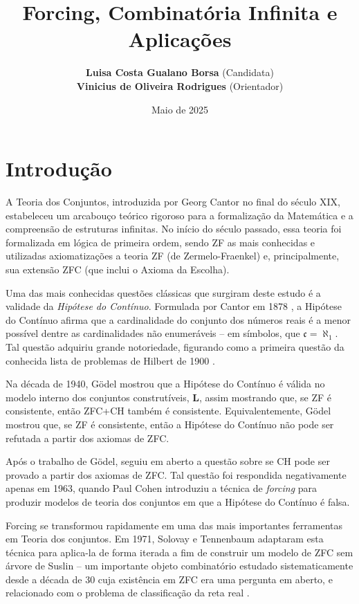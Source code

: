 \documentclass{article}
\author{
   \textbf{Luisa Costa Gualano Borsa} (Candidata)\\
    \textbf{Vinicius de Oliveira Rodrigues} (Orientador)\\
}
\title{\textbf{Forcing, Combinatória Infinita e Aplicações}}
\date{Maio de 2025}
\begin{document}
\maketitle
\begin{abstract}
\end{abstract}

\section{Introdução}
    A Teoria dos Conjuntos, introduzida por Georg Cantor no final do século XIX, estabeleceu um arcabouço teórico rigoroso para a formalização da Matemática e a compreensão de estruturas infinitas. No início do século passado, essa teoria foi formalizada em lógica de primeira ordem, sendo ZF as mais conhecidas e utilizadas axiomatizações a teoria ZF (de Zermelo-Fraenkel) e, principalmente, sua extensão ZFC (que inclui o Axioma da Escolha).

    Uma das mais conhecidas questões clássicas que surgiram deste estudo é a validade da \emph{Hipótese do Contínuo}.
    Formulada por Cantor em 1878 \cite{cantor1878beitrag}, a Hipótese do Contínuo afirma que a cardinalidade do conjunto dos números reais é a menor possível dentre as cardinalidades não enumeráveis -- em símbolos, que $\mathfrak c=\aleph_1$.
    Tal questão adquiriu grande notoriedade, figurando como a primeira questão da conhecida lista de problemas de Hilbert de 1900 \cite{hilbert1900mathematische}.

    Na década de 1940, Gödel mostrou que a Hipótese do Contínuo é válida no modelo interno dos conjuntos construtíveis, $\mathbf{L}$, assim mostrando que, se ZF é consistente, então ZFC+CH também é consistente.
    Equivalentemente, Gödel mostrou que, se ZF é consistente, então a Hipótese do Contínuo não pode ser refutada a partir dos axiomas de ZFC.
    
    Após o trabalho de Gödel, seguiu em aberto a questão sobre se CH pode ser provado a partir dos axiomas de ZFC.
    Tal questão foi respondida negativamente apenas em 1963, quando Paul Cohen \cite{cohen1963independence} introduziu a técnica de \emph{forcing} para produzir modelos de teoria dos conjuntos em que a Hipótese do Contínuo é falsa.

    Forcing se transformou rapidamente em uma das mais importantes ferramentas em Teoria dos conjuntos.
    Em 1971, Solovay e Tennenbaum \cite{solovay1971iterated} adaptaram esta técnica para aplica-la de forma iterada a fim de construir um modelo de ZFC sem árvore de Suslin -- um importante objeto combinatório estudado sistematicamente desde a década de 30 cuja existência em ZFC era uma pergunta em aberto, e relacionado com o problema de classificação da reta real \cite{kurepa1935ensembles}.
\end{document}
